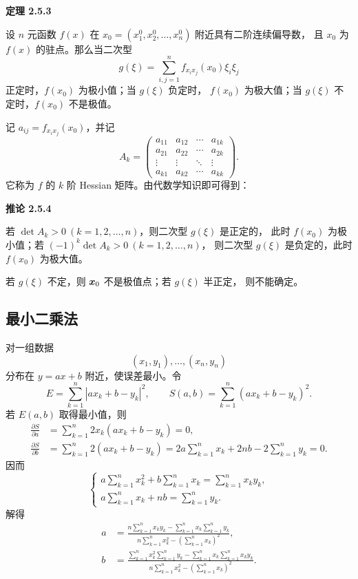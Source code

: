 \textbf{定理 2.5.3}

设 $n$ 元函数 $f(x)$ 在
$x_0=(x_1^0,x_2^0,\ldots,x_n^0)$ 附近具有二阶连续偏导数，
且 $x_0$ 为 $f(x)$ 的驻点。那么当二次型
\[
g(\xi)=\sum_{i,j=1}^{n}f_{x_i x_j}(x_0)\xi_i\xi_j
\]
正定时，$f(x_0)$ 为极小值；当 $g(\xi)$ 负定时，
$f(x_0)$ 为极大值；当 $g(\xi)$ 不定时，$f(x_0)$ 不是极值。




记 $a_{ij}=f_{x_i x_j}(x_0)$，并记
\[
A_k=
\begin{pmatrix}
a_{11}&a_{12}&\cdots&a_{1k}\\
a_{21}&a_{22}&\cdots&a_{2k}\\
\vdots&\vdots&\ddots&\vdots\\
a_{k1}&a_{k2}&\cdots&a_{kk}
\end{pmatrix}.
\]
它称为 $f$ 的 $k$ 阶 Hessian 矩阵。由代数学知识即可得到：



\textbf{推论 2.5.4}

若 $\det A_k>0\ (k=1,2,\ldots,n)$，则二次型 $g(\xi)$ 是正定的，
此时 $f(x_0)$ 为极小值；若
$(-1)^k\det A_k>0\ (k=1,2,\ldots,n)$，
则二次型 $g(\xi)$ 是负定的，此时 $f(x_0)$ 为极大值。




若 $g(\xi)$ 不定，则 $\boldsymbol{x}_0$ 不是极值点；若 $g(\xi)$ 半正定，
则不能确定。

\subsection*{最小二乘法}

对一组数据
\[
(x_1,y_1),\ldots,(x_n,y_n)
\]
分布在 $y=ax+b$ 附近，使误差最小。令
\[
E=\sum_{k=1}^{n}|ax_k+b-y_k|^2,
\qquad
S(a,b)=\sum_{k=1}^{n}(ax_k+b-y_k)^2.
\]
若 $E(a,b)$ 取得最小值，则
\[
\begin{aligned}
\frac{\partial S}{\partial a}
&=\sum_{k=1}^{n}2x_k(ax_k+b-y_k)=0,\\
\frac{\partial S}{\partial b}
&=\sum_{k=1}^{n}2(ax_k+b-y_k)
 =2a\sum_{k=1}^{n}x_k+2nb-2\sum_{k=1}^{n}y_k=0.
\end{aligned}
\]
因而
\[
\begin{cases}
a\displaystyle\sum_{k=1}^{n}x_k^2
 +b\displaystyle\sum_{k=1}^{n}x_k
 =\displaystyle\sum_{k=1}^{n}x_ky_k,\\[6pt]
a\displaystyle\sum_{k=1}^{n}x_k+nb
 =\displaystyle\sum_{k=1}^{n}y_k.
\end{cases}
\]
解得
\[
\begin{aligned}
a&=
\frac{
n\displaystyle\sum_{k=1}^{n}x_ky_k
-\displaystyle\sum_{k=1}^{n}x_k\sum_{k=1}^{n}y_k
}{
n\displaystyle\sum_{k=1}^{n}x_k^2
-\left(\displaystyle\sum_{k=1}^{n}x_k\right)^2
},\\[8pt]
b&=
\frac{
\displaystyle\sum_{k=1}^{n}x_k^2\sum_{k=1}^{n}y_k
-\displaystyle\sum_{k=1}^{n}x_k\sum_{k=1}^{n}x_ky_k
}{
n\displaystyle\sum_{k=1}^{n}x_k^2
-\left(\displaystyle\sum_{k=1}^{n}x_k\right)^2
}.
\end{aligned}
\]

